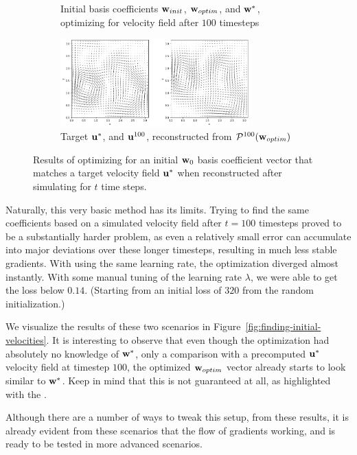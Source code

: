 \begin{figure}
\begin{subfigure}{\textwidth}
    \caption{Initial basis coefficients $\vb{w}_{init}$, $\vb{w}_{optim}$, and
    $\vb{w}^*$, optimizing for velocity field after $100$ timesteps\\}
  \end{subfigure}\par\medskip
  \begin{subfigure}{\textwidth}
    \centering
    \includegraphics[width=0.8\textwidth]{figures/finding-initial-velocities/t_100_velocities.png}
    \caption{Target $\vb{u}^*$, and $\vb{u}^{100}$, reconstructed from
      $\mathcal{P}^{100}(\vb{w}_{optim})$}
  \end{subfigure}
  \caption{Results of optimizing for an initial $\vb{w}_0$ basis coefficient
  vector that matches a target velocity field $\vb{u}^*$ when reconstructed
  after simulating for $t$ time steps.}
\end{figure}

Naturally, this very basic method has its limits. Trying to find the same
coefficients based on a simulated velocity field after $t=100$ timesteps proved
to be a substantially harder problem, as even a relatively small error can
accumulate into major deviations over these longer timesteps, resulting in much
less stable gradients.  With using the same learning rate, the optimization
diverged almost instantly. With some manual tuning of the learning rate
$\lambda$, we were able to get the loss below $0.14$. (Starting from an initial
loss of $320$ from the random initialization.) 

We visualize the results of these two scenarios in
Figure~\ref{fig:finding-initial-velocities}. It is interesting to observe that
even though the optimization had absolutely no knowledge of $\vb{w}^*$, only
a comparison with a precomputed $\vb{u^*}$ velocity field at timestep $100$, the
optimized $\vb{w}_{optim}$ vector already starts to look similar to $\vb{w}^*$.
Keep in mind that this is not guaranteed at all, as highlighted with the
. 

Although there are a number of ways to tweak this setup, from these results, it
is already evident from these scenarios that the flow of gradients working,
and is ready to be tested in more advanced scenarios.

